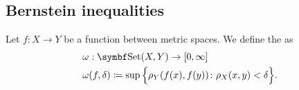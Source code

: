 \subsection{Bernstein inequalities}\label{subsec:bernstein_inequalities}

\begin{Definition}\label{def:modulus_of_continuity}\cite[27]{Николов2020}
  Let \( f: X \to Y \) be a function between metric spaces. We define the  as
  \begin{align*}
    &\omega: \Cat{Set}(X, Y) \to [0, \infty] \\
    &\omega(f, \delta) \coloneqq \sup \Big\{ \rho_Y(f(x), f(y)) \colon \rho_X(x, y) < \delta \Big\}.
  \end{align*}
\end{Definition}

